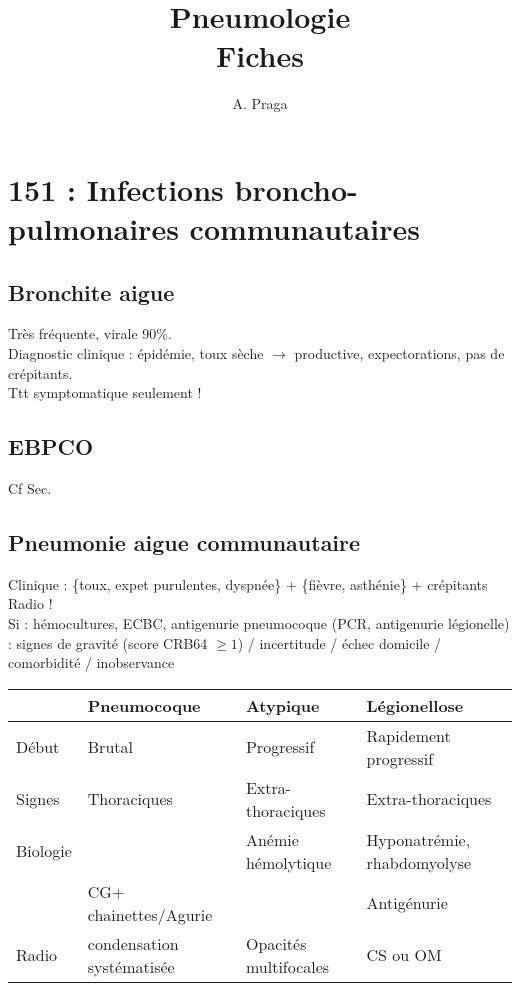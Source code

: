 \documentclass{article}
\title{Pneumologie\\
\large Fiches}
\author{A. Praga}
\begin{document}
\maketitle



\section{151 : Infections broncho-pulmonaires communautaires}
\subsection{Bronchite aigue}
Très fréquente, virale 90\%. \\
Diagnostic clinique : épidémie, toux sèche \(\to\) productive, expectorations,
pas de crépitants.\\
Ttt symptomatique seulement !

\subsection{EBPCO} Cf Sec.

\subsection{Pneumonie aigue communautaire}
Clinique : \{toux, expet purulentes, dyspnée\} + \{fièvre, asthénie\} +
crépitants\\
Radio !\\
Si \faHospitalSign : hémocultures, ECBC, antigenurie pneumocoque (PCR,
antigenurie légionelle)\\
\faHospitalSign : signes de gravité (score CRB64 \(\ge 1\)) / incertitude / échec domicile / comorbidité / inobservance

\begin{table}[htpb]
  \centering
  \label{Orientation clinique (non discriminant !)}
  \begin{tabular}{llll}
    \toprule
    & Pneumocoque & Atypique & Légionellose\\
    \midrule
    Début & Brutal & Progressif & Rapidement progressif\\
    Signes & Thoraciques & Extra-thoraciques & Extra-thoraciques\\
    Biologie &  & Anémie hémolytique & Hyponatrémie, rhabdomyolyse\\
    & CG+ chainettes/Agurie &  & Antigénurie\\
    Radio & condensation systématisée & Opacités multifocales & CS ou OM\\
    \bottomrule
  \end{tabular}
\end{table}
\end{document}
